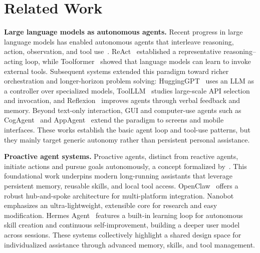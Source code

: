 



\section{Related Work}

\textbf{Large language models as autonomous agents.}
Recent progress in large language models has enabled autonomous agents
that interleave reasoning, action, observation, and tool use~\citep{chen2022program,duan2026codeplot,paranjape2023art,parisi2022talm,wei2022chain,yang2023mm}.
ReAct~\citep{yao2022react} established a representative
reasoning--acting loop, while Toolformer~\citep{schick2023toolformer}
showed that language models can learn to invoke external tools.
Subsequent systems extended this paradigm toward richer orchestration and
longer-horizon problem solving: HuggingGPT~\citep{shen2023hugginggpt}
uses an LLM as a controller over specialized models, ToolLLM~\citep{qin2023toolllm}
studies large-scale API selection and invocation, and
Reflexion~\citep{shinn2023reflexion} improves agents through verbal
feedback and memory. Beyond text-only interaction, GUI and computer-use
agents such as CogAgent~\citep{hong2024cogagent} and
AppAgent~\citep{zhang2025appagent} extend the paradigm to screens and
mobile interfaces. These works establish the basic agent loop and tool-use
patterns, but they mainly target generic autonomy rather than persistent
personal assistance.

\textbf{Proactive agent systems.}
Proactive agents, distinct from reactive agents, initiate actions and pursue goals autonomously, a concept formalized by~\cite{wooldridge1995intelligent}. This foundational work underpins modern long-running assistants that leverage persistent memory, reusable skills, and local tool access. OpenClaw~\citep{openclaw} offers a robust hub-and-spoke architecture for multi-platform integration. Nanobot~\citep{nanobot} emphasizes an ultra-lightweight, extensible core for research and easy modification. Hermes Agent~\citep{hermesagent2026} features a built-in learning loop for autonomous skill creation and continuous self-improvement, building a deeper user model across sessions. These systems collectively highlight a shared design space for individualized assistance through advanced memory, skills, and tool management.

